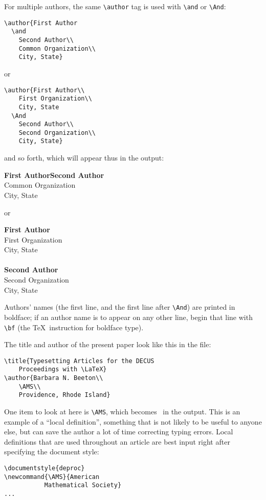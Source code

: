 For multiple authors, the same \verb"\author" tag is used with
\verb"\and" or \verb"\And":
\begin{verbatim}
\author{First Author
  \and
    Second Author\\
    Common Organization\\
    City, State}
\end{verbatim}
or
\begin{verbatim}
\author{First Author\\
    First Organization\\
    City, State
  \And
    Second Author\\
    Second Organization\\
    City, State}
\end{verbatim}
and so forth, which will appear thus in the output:\strut
\begin{center}
        {\bf First Author\enspace Second Author}\\
        Common Organization\\
        City, State
\end{center}
\par\noindent
or\strut
\begin{center}
        {\bf First Author}\\
        First Organization\\
        City, State\\
        \hspace{10pt}\\
        {\bf Second Author}\\
        Second Organization\\
        City, State\endgraf
\end{center}
Authors' names (the first line, and the first line after \verb"\And") are
printed in boldface; if an author name is to appear on any other line,
begin that line with \verb"\bf" (the \TeX\ instruction for boldface type).

The title and author of the present paper look like this in the file:
\begin{verbatim}
\title{Typesetting Articles for the DECUS
    Proceedings with \LaTeX}
\author{Barbara N. Beeton\\
    \AMS\\
    Providence, Rhode Island}
\end{verbatim}
One item to look at here is \verb"\AMS", which becomes \AMS\ in the output.
This is an example of a ``local definition'', something that is not likely
to be useful to anyone else, but can save the author a lot of time correcting
typing errors.  Local definitions that are used throughout an article are
best input right after specifying the document style:
\begin{verbatim}
\documentstyle{deproc}
\newcommand{\AMS}{American
           Mathematical Society}
...

\end{verbatim}

